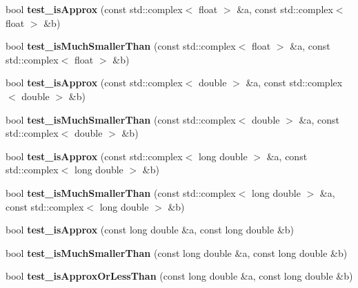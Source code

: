 \begin{DoxyCompactItemize}
\item 
\mbox{\label{namespace_eigen_a866914d9c95461cc21d9d5a42c9fcdf8}} 
bool {\bfseries test\+\_\+is\+Approx} (const std\+::complex$<$ float $>$ \&a, const std\+::complex$<$ float $>$ \&b)
\item 
\mbox{\label{namespace_eigen_a539da498bda2dcfc0edcf0bda2c2be73}} 
bool {\bfseries test\+\_\+is\+Much\+Smaller\+Than} (const std\+::complex$<$ float $>$ \&a, const std\+::complex$<$ float $>$ \&b)
\item 
\mbox{\label{namespace_eigen_a7b782390e9d798029c2e24529766e457}} 
bool {\bfseries test\+\_\+is\+Approx} (const std\+::complex$<$ double $>$ \&a, const std\+::complex$<$ double $>$ \&b)
\item 
\mbox{\label{namespace_eigen_ab9a5ea7d4707d277d788b8ff80ccf127}} 
bool {\bfseries test\+\_\+is\+Much\+Smaller\+Than} (const std\+::complex$<$ double $>$ \&a, const std\+::complex$<$ double $>$ \&b)
\item 
\mbox{\label{namespace_eigen_a4b0abfedf97e2323b090f249243986ba}} 
bool {\bfseries test\+\_\+is\+Approx} (const std\+::complex$<$ long double $>$ \&a, const std\+::complex$<$ long double $>$ \&b)
\item 
\mbox{\label{namespace_eigen_ad493ae50921288fb3f62f4732aeb2876}} 
bool {\bfseries test\+\_\+is\+Much\+Smaller\+Than} (const std\+::complex$<$ long double $>$ \&a, const std\+::complex$<$ long double $>$ \&b)
\item 
\mbox{\label{namespace_eigen_adcac98601217024dc7ceef2e8f74c5c6}} 
bool {\bfseries test\+\_\+is\+Approx} (const long double \&a, const long double \&b)
\item 
\mbox{\label{namespace_eigen_a5a9835dfcb4613af3cceb32c7eb9e3cd}} 
bool {\bfseries test\+\_\+is\+Much\+Smaller\+Than} (const long double \&a, const long double \&b)
\item 
\mbox{\label{namespace_eigen_a37038e95456c17b19dc69180583444bb}} 
bool {\bfseries test\+\_\+is\+Approx\+Or\+Less\+Than} (const long double \&a, const long double \&b)

\end{DoxyCompactItemize}
